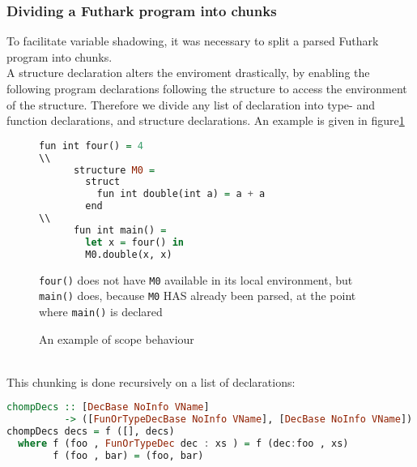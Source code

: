 \subsubsection{Dividing a Futhark program into chunks}
To facilitate variable shadowing, it was necessary to split a parsed Futhark
program into chunks.
\\
A structure declaration alters the enviroment drastically, by enabling the
following program declarations following the structure to access the environment
of the structure.
Therefore we divide any list of declaration into type- and function
declarations, and structure declarations.
An example is given in figure\ref{chunks}
\begin{figure}
  \begin{tcolorbox}
    \begin{lstlisting}[language=Haskell]
      fun int four() = 4
\\
      structure M0 =
        struct
          fun int double(int a) = a + a
        end
\\
      fun int main() =
        let x = four() in
        M0.double(x, x)
  \end{lstlisting}
  \texttt{four()} does not have \texttt{M0} available in its local environment, but
    \texttt{main()} does, because \texttt{M0} HAS already been parsed, at the point where
    \texttt{main()} is declared
  \end{tcolorbox}
  \caption{An example of scope behaviour \label{chunks}}
\end{figure}
\\
This chunking is done recursively on a list of declarations:
\begin{lstlisting}[language=Haskell]
chompDecs :: [DecBase NoInfo VName]
          -> ([FunOrTypeDecBase NoInfo VName], [DecBase NoInfo VName])
chompDecs decs = f ([], decs)
  where f (foo , FunOrTypeDec dec : xs ) = f (dec:foo , xs)
        f (foo , bar) = (foo, bar)
\end{lstlisting}
\clearpage
